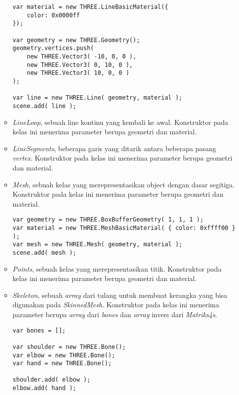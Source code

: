 \begin{itemize}
\begin{itemize}
\begin{lstlisting}[caption={Contoh penggunaan kelas {\it Line}.},captionpos=b]
var material = new THREE.LineBasicMaterial({
	color: 0x0000ff
});

var geometry = new THREE.Geometry();
geometry.vertices.push(
	new THREE.Vector3( -10, 0, 0 ),
	new THREE.Vector3( 0, 10, 0 ),
	new THREE.Vector3( 10, 0, 0 )
);

var line = new THREE.Line( geometry, material );
scene.add( line );
\end{lstlisting}
	
	\item {\it LineLoop}, sebuah line kontinu yang kembali ke awal. Konstruktor pada kelas ini menerima parameter berupa geometri dan material.
	
	\item {\it LineSegments}, beberapa garis yang ditarik antara beberapa pasang {\it vertex}. Konstruktor pada kelas ini menerima parameter berupa geometri dan material.
	
	\item {\it Mesh}, sebuah kelas yang merepresentasikan object dengan dasar segitiga. Konstruktor pada kelas ini menerima parameter berupa geometri dan material.
	
\begin{lstlisting}[caption={Contoh penggunaan kelas {\it Mesh}.},captionpos=b]
var geometry = new THREE.BoxBufferGeometry( 1, 1, 1 );
var material = new THREE.MeshBasicMaterial( { color: 0xffff00 } );
var mesh = new THREE.Mesh( geometry, material );
scene.add( mesh );
\end{lstlisting}
	
	\item {\it Points}, sebuah kelas yang merepresentasikan titik. Konstruktor pada kelas ini menerima parameter berupa geometri dan material.
	
	\item {\it Skeleton}, sebuah {\it array} dari tulang untuk membuat kerangka yang bisa digunakan pada {\it SkinnedMesh}. Konstruktor pada kelas ini menerima parameter berupa {\it array} dari {\it bones} dan {\it array} invers dari {\it Matriks4s}. 
	
\begin{lstlisting}[caption={Contoh penggunaan kelas {\it Skeleton}.},captionpos=b]
var bones = [];

var shoulder = new THREE.Bone();
var elbow = new THREE.Bone();
var hand = new THREE.Bone();

shoulder.add( elbow );
elbow.add( hand );


\end{lstlisting}
\end{itemize}
\end{itemize}
